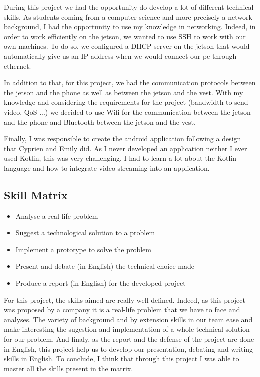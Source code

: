 During this project we had the opportunity do develop a lot of different technical skills. As students coming from a computer science and more precisely a network background, I had the opportunity to use my knowledge in networking. Indeed, in order to work efficiently on the jetson, we wanted to use SSH to work with our own machines. To do so, we configured a DHCP server on the jetson that would automatically give us an IP address when we would connect our pc through ethernet. 
\\\par
In addition to that, for this project, we had the communication protocols between the jetson and the phone as well as between the jetson and the vest. With my knowledge and considering the requirements for the project (bandwidth to send video, QoS ...) we  decided to use Wifi for the communication between the jetson and the phone and Bluetooth between the jetson and the vest.
\\\par
Finally, I was responsible to create the android application following a design that Cyprien and Emily did. As I never developed an application neither I ever used Kotlin, this was very challenging. I had to learn a lot about the Kotlin language and how to integrate video streaming into an application. 

\subsection{Skill Matrix}

\begin{itemize}
    \item Analyse a real-life problem
    \item Suggest a technological solution to a problem
    \item Implement a prototype to solve the problem
    \item Present and debate (in English) the technical choice made
    \item Produce a report (in English) for the developed project 
\end{itemize}

For this project, the skills aimed are really well defined. Indeed, as this project was proposed by a company it is a real-life problem that we have to face and analyses. The variety of background and by extension skills in our team ease and make interesting the sugestion and implementation of a whole technical solution for our problem. And finaly, as the report and the defense of the project are done in English, this project help  us to develop our presentation, debating and writing skills in English. To conclude, I think that through this project I was able to master all the skills present in the matrix.

